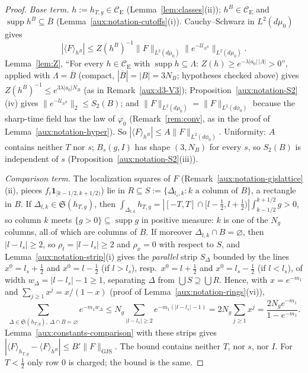 \documentclass[11pt,a4paper]{article}
\theoremstyle{plain}
\theoremstyle{definition}
\theoremstyle{plain}
\theoremstyle{definition}
\newcommand{\CE}{\mathcal{C}_{\mathrm E}}
\DeclareMathOperator{\supp}{supp}
\newcommand{\GJS}[1]{\lVert #1\rVert_{\mathrm{GJS}}}   %
\newcommand{\ev}[2]{\langle #1\rangle_{#2}}            %
\newcommand{\Uc}{\mathcal U}
\newcommand{\dmu}{d\mu_0}
\newcommand{\dphi}{d\phi_0}
\begin{document}
\begin{proof}
\emph{Base term.}  $h:=h_{T,g}\in\CE$ (Lemma~\ref{lem:classes}(ii)); $h^B\in\CE$ and $\supp
h^B\subseteq\overline B$ (Lemma~\ref{aux:notation-cutoffs}(i)).  Cauchy--Schwarz in
$L^2(\dmu)$ gives
\[
 |\ev F{h^B}|\le Z(h^B)^{-1}\|F\|_{L^2(\dmu)}\|e^{-\Uc_{h^B}}\|_{L^2(\dmu)} .
\]
Lemma~\ref{lem:Z}, ``For every $h\in\CE$ with $\supp h\subseteq\Lambda$:
$Z(h)\ge e^{-\lambda|a_0|\,|\Lambda|}>0$'', applied with $\Lambda=\overline B$ (compact,
$|\overline B|=|B|=3N_B$; hypotheses checked above) gives $Z(h^B)^{-1}\le e^{3\lambda|a_0|N_B}$
(as in Remark~\ref{aux:d3-V3});
Proposition~\ref{aux:notation-S2}(iv) gives $\|e^{-\Uc_{h^B}}\|_2\le S_2(B)$; and
$\|F\|_{L^2(\dmu)}=\|F\|_{L^2(\dphi)}$ because the sharp-time field has the law of
$\varphi_0$ (Remark~\ref{rem:conv}, as in the proof of
Lemma~\ref{aux:notation-hyper}).  So $|\ev F{h^B}|\le A\|F\|_{L^2(\dphi)}$.  Uniformity: $A$
contains neither $T$ nor $s$; $B_s(g,I)$ has shape $(3,N_B)$ for every $s$, so $S_2(B)$ is
independent of $s$ (Proposition~\ref{aux:notation-S2}(iii)).

\emph{Comparison term.}  The localization squares of $F$ (Remark~\ref{aux:notation-gjslattice}(ii),
pieces $f_i\mathbf 1_{[k-1/2,k+1/2)}$) lie in $R\subseteq S:=\{\Delta_{l_s,k}:k\text{ a column
of }B\}$, a rectangle in $B$.  If $\Delta_{l,k}\in\mathfrak S(h_{T,g})$, then
$\int_{\Delta_{l,k}}h_{T,g}=|[-T,T]\cap[l-\frac12,l+\frac12)|\int_{k-1/2}^{k+1/2}g>0$, so
column $k$ meets $\{g>0\}\subseteq\supp g$ in positive measure: $k$ is one of the $N_g$
columns, all of which are columns of $B$.  If moreover $\Delta_{l,k}\cap B=\varnothing$, then
$|l-l_s|\ge2$, so $\rho_t=|l-l_s|\ge2$ and $\rho_x=0$ with respect to $S$, and
Lemma~\ref{aux:notation-strip}(i) gives the \emph{parallel} strip $S_\Delta$ bounded by the
lines $x^0=l_s+\frac12$ and $x^0=l-\frac12$ (if $l>l_s$), resp.\ $x^0=l+\frac12$ and
$x^0=l_s-\frac12$ (if $l<l_s$), of width $w_\Delta=|l-l_s|-1\ge1$, separating $\Delta$ from
$\bigcup S\supseteq\bigcup R$.  Hence, with $x=e^{-m_1}$ and $\sum_{j\ge1}x^j=x/(1-x)$ (proof of
Lemma~\ref{aux:notation-rings}(vi)),
\[
 \sum_{\Delta\in\mathfrak S(h_{T,g}),\ \Delta\cap B=\varnothing}e^{-m_1w_\Delta}
 \le N_g\sum_{|l-l_s|\ge2}e^{-m_1(|l-l_s|-1)}=2N_g\sum_{j\ge1}x^j=\frac{2N_ge^{-m_1}}{1-e^{-m_1}} .
\]
Lemma~\ref{aux:constants-comparison} with these strips gives
$|\ev F{h_{T,g}}-\ev F{h^B}|\le B'\GJS F$.  The
bound contains neither $T$, nor $s$, nor $I$.  For $T<\frac12$ only row $0$ is charged; the
bound is the same.
\end{proof}
\end{document}
